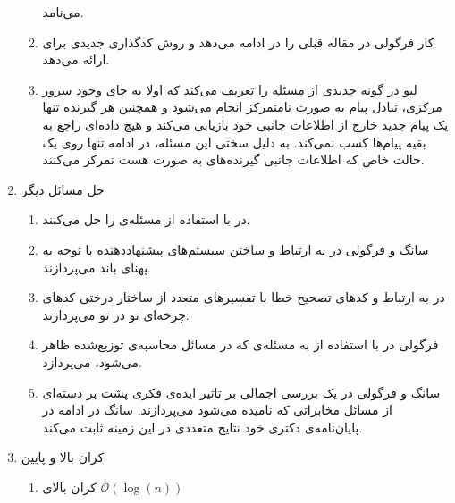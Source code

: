 \begin{enumerate}
\begin{enumerate}
 		می‌نامد.
 		\item 
 		 کار فرگولی در مقاله قبلی را در
 		\cite{8625330}
 		ادامه می‌دهد و روش کدگذاری جدیدی برای 
 		ارائه می‌دهد.
 		\item 
 		لیو در
 		\cite{9173957}
 		گونه جدیدی از مسئله را تعریف می‌کند که اولا به جای وجود سرور مرکزی، تبادل پیام به صورت نامتمرکز انجام می‌شود و همچنین هر گیرنده تنها یک پیام جدید خارج از اطلاعات جانبی خود بازیابی می‌کند و هیچ داده‌ای راجع به بقیه پیام‌ها کسب نمی‌کند. به دلیل سختی این مسئله، در ادامه تنها روی یک حالت خاص که اطلاعات جانبی گیرنده‌های به صورت
 		هست تمرکز می‌کنند.	
 		
 	\end{enumerate}
 	\item حل مسائل دیگر
 	\begin{enumerate}
 		\item 
 		در
 		\cite{Obead_2023}
 		با استفاده از  
 		\picod
 		مسئله‌ی
 		را حل می‌کنند.
 		\item
 		سانگ و فرگولی در
 		\cite{8404065}
 		به ارتباط 
 		\picod
 		و ساختن سیستم‌های پیشنهاددهنده‌ با توجه به پهنای باند می‌پردازند.
 		\item
 		در
 		\cite{e24081149}
 		به ارتباط 
 		\icod
 		و
 		\picod
 		کدهای تصحیح خطا با تفسیرهای متعدد از ساختار درختی کدهای چرخه‌ای تو در تو
 		می‌پردازند.
 		\item 
 		فرگولی در
 		\cite{datashuf}
 		با استفاده از
 		\picod
 		به مسئله‌ی
 		که در مسائل محاسبه‌ی توزیع‌شده ظاهر می‌شود، می‌پردازد.
 		\item
 		سانگ و فرگولی در
 		\cite{7176784}
 		یک بررسی‌ اجمالی بر تاثیر ایده‌ی فکری پشت
 		\picod
 		بر دسته‌ای از مسائل مخابراتی که
 		نامیده می‌شود می‌پردازند. سانگ در ادامه در پایان‌نامه‌ی دکتری خود
 		\cite{linqiphd}
 		نتایج متعددی در این زمینه ثابت می‌کند.
 	\end{enumerate}
 	\item کران بالا و پایین
 	\begin{enumerate}
 		\item 
 		کران بالای
 		$\mathcal{O}(\log(n))$

\end{enumerate}
\end{enumerate}
